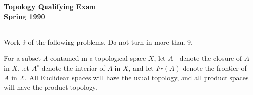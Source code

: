 \documentclass{article}
\begin{document}






\begin{center}\begin{LARGE}
{\bf Topology Qualifying Exam}\\ 
{\bf Spring 1990}\\ \end{LARGE}
\end{center}
\vspace{0.1in}
\noindent\hrulefill\\

Work 9 of the following problems. Do not turn in more than 9.

For a subset $A$ contained in a topological space $X$, let $A^-$ denote
the closure of $A$ in $X$, let $A^\circ$ denote the interior of $A$ in $X$,
and let $Fr(A)$ denote the frontier of $A$ in $X$. All Euclidean spaces will
have the usual topology, and all product spaces will have the product
topology.
\end{document}
